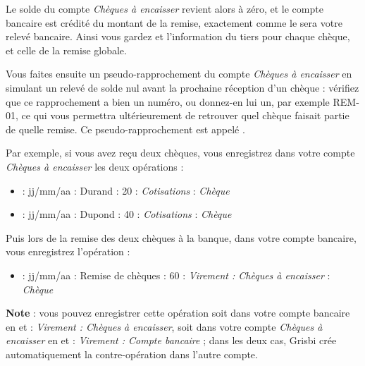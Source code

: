 Le solde du compte \emph{Chèques à encaisser} revient alors à zéro, et le compte bancaire est crédité du montant de la remise, exactement comme le sera votre relevé bancaire. Ainsi vous gardez et l'information du tiers pour chaque chèque, et celle de la remise globale.

Vous faites ensuite un pseudo-rapprochement du compte \emph{Chèques à encaisser} en simulant un relevé de solde nul avant la prochaine réception d'un chèque : vérifiez que ce rapprochement a bien un numéro, ou donnez-en lui un, par exemple REM-01, ce qui vous permettra ultérieurement de retrouver quel chèque faisait partie de quelle remise. Ce pseudo-rapprochement est appelé \emph{}.


Par exemple, si vous avez reçu deux chèques, vous enregistrez dans votre compte \emph{Chèques à encaisser} les deux opérations :

\begin{itemize}
	\item {} : jj/mm/aa   : Durand   : 20   : \emph{Cotisations}   : \emph{Chèque}
	\item {} : jj/mm/aa   : Dupond   : 40   : \emph{Cotisations}   : \emph{Chèque}
\end{itemize}

Puis lors de la remise des deux chèques à la banque, dans votre compte bancaire, vous enregistrez l'opération :

\begin{itemize}
	\item {} : jj/mm/aa   : Remise de chèques   : 60   : \emph{Virement : Chèques à encaisser}   : \emph{Chèque}
\end{itemize}

\textbf{Note} : vous pouvez enregistrer cette opération soit dans votre compte bancaire en  et  : \emph{Virement : Chèques à encaisser}, soit dans votre compte \emph{Chèques à encaisser} en  et  : \emph{Virement : Compte bancaire} ; dans les deux cas, Grisbi crée automatiquement la contre-opération dans l'autre compte.

